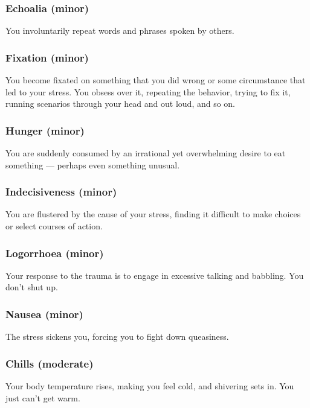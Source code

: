 \subsubsection{Echoalia (minor)} 

You involuntarily repeat words and phrases spoken by others. 

\subsubsection{Fixation (minor)} 

You become fixated on something that you did wrong or some circumstance that led to your stress. You obsess over it, repeating the behavior, trying to fix it, running scenarios through your head and out loud, and so on. 

\subsubsection{Hunger (minor)} 

You are suddenly consumed by an irrational yet overwhelming desire to eat something --- perhaps even something unusual. 

\subsubsection{Indecisiveness (minor)} 

You are flustered by the cause of your stress, finding it difficult to make choices or select courses of action. 

\subsubsection{Logorrhoea (minor)} 

Your response to the trauma is to engage in excessive talking and babbling. You don’t shut up. 

\subsubsection{Nausea (minor)} 

The stress sickens you, forcing you to fight down queasiness. 

\subsubsection{Chills (moderate)} 

Your body temperature rises, making you feel cold, and shivering sets in. You just can’t get warm. 

